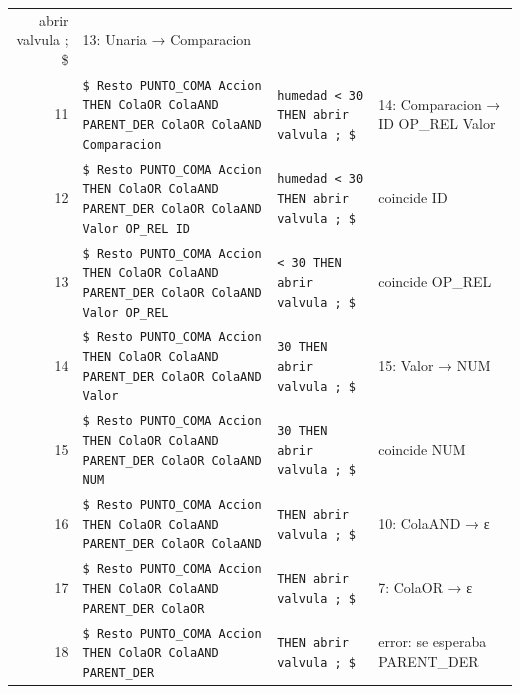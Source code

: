 \documentclass[11pt,a4paper]{article}
\begin{document}
\begin{xltabular}{\textwidth}{r Y{1.3} Y{0.9} Y{0.8}}
{  abrir valvula ; \$} & 13: Unaria → Comparacion \\
  11 & \texttt{\$ Resto PUNTO\_\allowbreak{}COMA
    Accion THEN ColaOR ColaAND PARENT\_\allowbreak{}DER
  ColaOR ColaAND Comparacion} & \texttt{humedad < 30
  THEN abrir valvula ; \$} & 14: Comparacion → ID
  OP\_REL Valor \\
  12 & \texttt{\$ Resto PUNTO\_\allowbreak{}COMA
    Accion THEN ColaOR ColaAND PARENT\_\allowbreak{}DER
  ColaOR ColaAND Valor OP\_\allowbreak{}REL ID} &
  \texttt{humedad < 30 THEN abrir valvula ; \$} & coincide ID \\
  13 & \texttt{\$ Resto PUNTO\_\allowbreak{}COMA
    Accion THEN ColaOR ColaAND PARENT\_\allowbreak{}DER
  ColaOR ColaAND Valor OP\_\allowbreak{}REL} &
  \texttt{< 30 THEN abrir valvula ; \$} & coincide OP\_REL \\
  14 & \texttt{\$ Resto PUNTO\_\allowbreak{}COMA
    Accion THEN ColaOR ColaAND PARENT\_\allowbreak{}DER
  ColaOR ColaAND Valor} & \texttt{30 THEN abrir
  valvula ; \$} & 15: Valor → NUM \\
  15 & \texttt{\$ Resto PUNTO\_\allowbreak{}COMA
    Accion THEN ColaOR ColaAND PARENT\_\allowbreak{}DER
  ColaOR ColaAND NUM} & \texttt{30 THEN abrir valvula
  ; \$} & coincide NUM \\
  16 & \texttt{\$ Resto PUNTO\_\allowbreak{}COMA
    Accion THEN ColaOR ColaAND PARENT\_\allowbreak{}DER
  ColaOR ColaAND} & \texttt{THEN abrir valvula ; \$}
  & 10: ColaAND → ε \\
  17 & \texttt{\$ Resto PUNTO\_\allowbreak{}COMA
    Accion THEN ColaOR ColaAND PARENT\_\allowbreak{}DER
  ColaOR} & \texttt{THEN abrir valvula ; \$} & 7: ColaOR → ε \\
  18 & \texttt{\$ Resto PUNTO\_\allowbreak{}COMA
    Accion THEN ColaOR ColaAND
  PARENT\_\allowbreak{}DER} & \texttt{THEN abrir
  valvula ; \$} & error: se esperaba PARENT\_DER \\
  \bottomrule
\end{xltabular}
\endgroup
\end{document}
